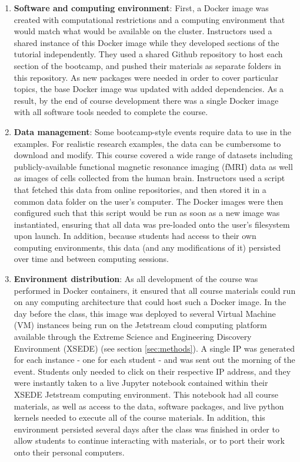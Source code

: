 \begin{enumerate}

\item {\bf Software and computing environment}: First, a Docker image
\cite{merkel2014docker} was created with computational restrictions and a
computing environment that would match what would be available on the cluster.
Instructors used a shared instance of this Docker image while they developed
sections of the tutorial independently. They used a shared Github repository to
host each section of the bootcamp, and pushed their materials as separate
folders in this repository. As new packages were needed in order to cover
particular topics, the base Docker image was updated with added dependencies. As
a result, by the end of course development there was a single Docker image with
all software tools needed to complete the course.

\item {\bf Data management}: Some bootcamp-style events require data to use in
the examples. For realistic research examples, the data can be cumbersome to
download and modify. This course covered a wide range of datasets including
publicly-available functional magnetic resonance imaging (fMRI) data as well as
images of cells collected from the human brain. Instructors used a script that
fetched this data from online repositories, and then stored it in a common data
folder on the user's computer. The Docker images were then configured such that
this script would be run as soon as a new image was instantiated, ensuring that
all data was pre-loaded onto the user's filesystem upon launch. In addition,
because students had access to their own computing environments, this data (and
any modifications of it) persisted over time and between computing sessions.

\item {\bf Environment distribution}: As all development of the course was
performed in Docker containers, it ensured that all course materials could run
on any computing architecture that could host such a Docker image. In the day
before the class, this image was deployed to several Virtual Machine (VM)
instances being run on the Jetstream cloud computing platform
\cite{Stewart2014Jestream} available through the Extreme Science and Engineering
Discovery Environment (XSEDE) \cite{Towns2014XSEDE}  (see section
\ref{sec:methods}). A single IP was generated for each instance - one for each
student - and was sent out the morning of the event. Students only needed to
click on their respective IP address, and they were instantly taken to a live
Jupyter notebook contained within their XSEDE Jetstream computing
environment. This notebook had all course materials, as well as access to the
data, software packages, and live python kernels needed to execute all of the
course materials. In addition, this environment persisted several days after the
class was finished in order to allow students to continue interacting with
materials, or to port their work onto their personal computers.

\end{enumerate}

